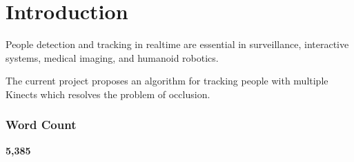 \section{Introduction}
\label{sec:introduction}

People detection and tracking in realtime are essential in surveillance, interactive systems, medical imaging, and humanoid robotics.

The current project proposes an algorithm for tracking people with multiple Kinects which resolves the problem of occlusion.

\subsubsection{Word Count}

\textbf{5,385}
